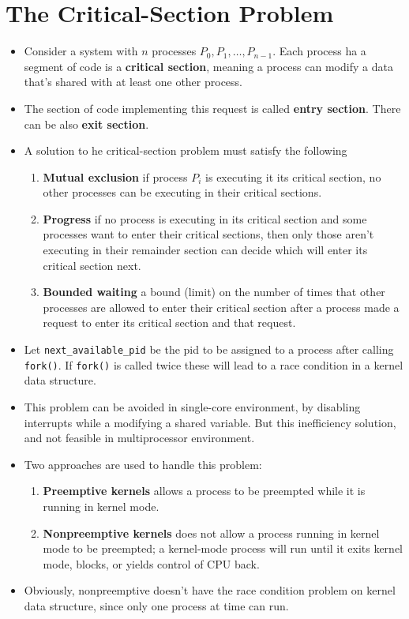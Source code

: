 \documentclass{report}
\def\code#1{\texttt{#1}}
\begin{document}
\section{The Critical-Section Problem}%

\begin{itemize}
	\item Consider a system with $ n $ processes $ {P_0, P_1, \dots, P_{n-1}} $. Each process ha a segment of code
	      is a \textbf{critical section}, meaning a process can modify a data that's shared with at least one
	      other process.
	\item The section of code implementing this request is called \textbf{entry section}. There can be also
	      \textbf{exit section}.
	\item A solution to he critical-section problem must satisfy the following
	      \begin{enumerate}
		      \item \textbf{Mutual exclusion} if process $P_i$ is executing it its critical section, no other processes
		            can be executing in their critical sections.
		      \item \textbf{Progress} if no process is executing in its critical section and some processes want to
		            enter their critical sections, then only those aren't executing in their remainder section can
		            decide which will enter its critical section next.
		      \item \textbf{Bounded waiting} a bound (limit) on the number of times that other processes are allowed
		            to enter their critical section after a process made a request to enter its critical section
		            and that request.
	      \end{enumerate}
	\item Let \code{next\_available\_pid} be the pid to be assigned to a process after calling \code{fork()}. If
	      \code{fork()} is called twice these will lead to a race condition in a kernel data structure.
	\item This problem can be avoided in single-core environment, by disabling interrupts while a modifying
	      a shared variable. But this inefficiency solution, and not feasible in multiprocessor environment.
	\item Two approaches are used to handle this problem:
	      \begin{enumerate}
		      \item \textbf{Preemptive kernels} allows a process to be preempted while it is running in kernel mode.
		      \item \textbf{Nonpreemptive kernels} does not allow a process running in kernel mode to be
		            preempted; a kernel-mode process will run until it exits kernel mode, blocks, or yields control of
		            CPU back.
	      \end{enumerate}
	\item Obviously, nonpreemptive doesn't have the race condition problem on kernel data structure,
	      since only one process at time can run.
\end{itemize}
\end{document}
